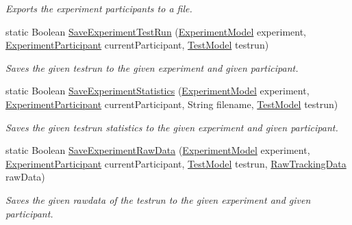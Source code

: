 \begin{DoxyCompactItemize}
\begin{DoxyCompactList}\small\item\em Exports the experiment participants to a file. \end{DoxyCompactList}\item 
static Boolean \hyperlink{class_web_analyzer_1_1_controller_1_1_export_controller_a6053d7ce4cb34a29e17a212d5613cc79}{Save\+Experiment\+Test\+Run} (\hyperlink{class_web_analyzer_1_1_models_1_1_base_1_1_experiment_model}{Experiment\+Model} experiment, \hyperlink{class_web_analyzer_1_1_models_1_1_base_1_1_experiment_participant}{Experiment\+Participant} current\+Participant, \hyperlink{class_web_analyzer_1_1_models_1_1_data_model_1_1_test_model}{Test\+Model} testrun)
\begin{DoxyCompactList}\small\item\em Saves the given testrun to the given experiment and given participant. \end{DoxyCompactList}\item 
static Boolean \hyperlink{class_web_analyzer_1_1_controller_1_1_export_controller_a08b9a190bd2cf514d7c2989e8e121703}{Save\+Experiment\+Statistics} (\hyperlink{class_web_analyzer_1_1_models_1_1_base_1_1_experiment_model}{Experiment\+Model} experiment, \hyperlink{class_web_analyzer_1_1_models_1_1_base_1_1_experiment_participant}{Experiment\+Participant} current\+Participant, String filename, \hyperlink{class_web_analyzer_1_1_models_1_1_data_model_1_1_test_model}{Test\+Model} testrun)
\begin{DoxyCompactList}\small\item\em Saves the given testrun statistics to the given experiment and given participant. \end{DoxyCompactList}\item 
static Boolean \hyperlink{class_web_analyzer_1_1_controller_1_1_export_controller_a08a2ba34501efa8e3cca837af7a3dd07}{Save\+Experiment\+Raw\+Data} (\hyperlink{class_web_analyzer_1_1_models_1_1_base_1_1_experiment_model}{Experiment\+Model} experiment, \hyperlink{class_web_analyzer_1_1_models_1_1_base_1_1_experiment_participant}{Experiment\+Participant} current\+Participant, \hyperlink{class_web_analyzer_1_1_models_1_1_data_model_1_1_test_model}{Test\+Model} testrun, \hyperlink{class_web_analyzer_1_1_models_1_1_base_1_1_raw_tracking_data}{Raw\+Tracking\+Data} raw\+Data)
\begin{DoxyCompactList}\small\item\em Saves the given rawdata of the testrun to the given experiment and given participant. \end{DoxyCompactList}\item 

\end{DoxyCompactItemize}
